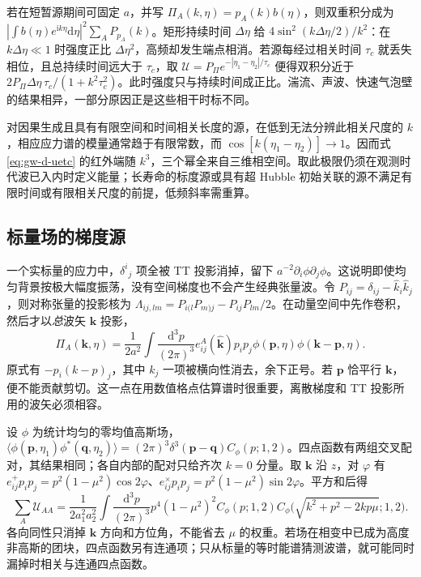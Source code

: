 若在短暂源期间可固定 $a$，并写 $\Pi_A(k,\eta)=p_A(k)b(\eta)$，则双重积分成为 $|\int b(\eta)e^{\mathrm i k\eta}\mathrm d\eta|^2\sum_A P_{p_A}(k)$。矩形持续时间 $\Delta\eta$ 给 $4\sin^2(k\Delta\eta/2)/k^2$：在 $k\Delta\eta\ll1$ 时强度正比 $\Delta\eta^2$，高频却发生端点相消。若源每经过相关时间 $\tau_c$ 就丢失相位，且总持续时间远大于 $\tau_c$，取 $\mathcal U=P_\Pi e^{-|\eta_1-\eta_2|/\tau_c}$ 便得双积分近于 $2P_\Pi\Delta\eta\,\tau_c/(1+k^2\tau_c^2)$。此时强度只与持续时间成正比。湍流、声波、快速气泡壁的结果相异，一部分原因正是这些相干时标不同。

对因果生成且具有有限空间和时间相关长度的源，在低到无法分辨此相关尺度的 $k$，相应应力谱的模量通常趋于有限常数，而 $\cos[k(\eta_1-\eta_2)]\to1$。因而式 \eqref{eq:gw-d-uetc} 的红外端随 $k^3$，三个幂全来自三维相空间。取此极限仍须在观测时代波已入内时定义能量；长寿命的标度源或具有超 Hubble 初始关联的源不满足有限时间或有限相关尺度的前提，低频斜率需重算。

\subsection{标量场的梯度源}

一个实标量的应力中，$\delta^i{}_j$ 项全被 TT 投影消掉，留下 $a^{-2}\partial_i\phi\partial_j\phi$。这说明即使均匀背景按极大幅度振荡，没有空间梯度也不会产生经典张量波。令 $P_{ij}=\delta_{ij}-\hat k_i\hat k_j$，则对称张量的投影核为 $\Lambda_{ij,lm}=P_{i(l}P_{m)j}-P_{ij}P_{lm}/2$。在动量空间中先作卷积，然后才以\emph{总}波矢 $\bm k$ 投影，
\[
 \Pi_A(\bm k,\eta)
 =\frac{1}{2a^2}\int\frac{\mathrm d^3p}{(2\pi)^3}
       e^A_{ij}(\hat{\bm k})p_i p_j
       \phi(\bm p,\eta)\phi(\bm k-\bm p,\eta).
\]
原式有 $-p_i(k-p)_j$，其中 $k_j$ 一项被横向性消去，余下正号。若 $\bm p$ 恰平行 $\bm k$，便不能贡献剪切。这一点在用数值格点估算谱时很重要，离散梯度和 TT 投影所用的波矢必须相容。

设 $\phi$ 为统计均匀的零均值高斯场，$\langle\phi(\bm p,\eta_1)\phi^*(\bm q,\eta_2)\rangle=(2\pi)^3\delta^3(\bm p-\bm q)C_\phi(p;1,2)$。四点函数有两组交叉配对，其结果相同；各自内部的配对只给齐次 $k=0$ 分量。取 $\bm k$ 沿 $z$，对 $\varphi$ 有 $e^+_{ij}p_ip_j=p^2(1-\mu^2)\cos2\varphi$、$e^\times_{ij}p_ip_j=p^2(1-\mu^2)\sin2\varphi$。平方和后得
\[
 \sum_A\mathcal U_{AA}
 =\frac{1}{2a_1^2a_2^2}\int\frac{\mathrm d^3p}{(2\pi)^3}
 p^4(1-\mu^2)^2 C_\phi(p;1,2)
 C_\phi\big(\sqrt{k^2+p^2-2kp\mu};1,2\big).
\]
各向同性只消掉 $\bm k$ 方向和方位角，不能省去 $\mu$ 的权重。若场在相变中已成为高度非高斯的团块，四点函数另有连通项；只从标量的等时能谱猜测波谱，就可能同时漏掉时相关与连通四点函数。

